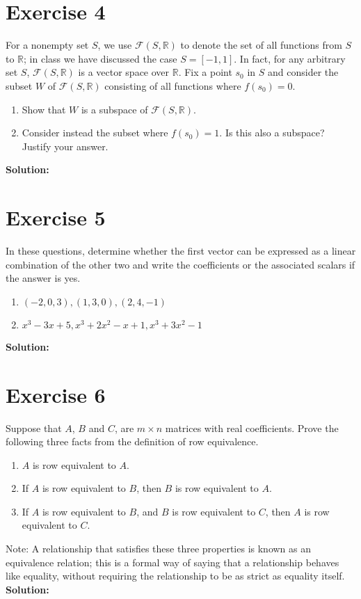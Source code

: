 \documentclass{article}
\begin{document}
\newpage

\section*{Exercise 4}
For a nonempty set $S$, we use $\mathcal{F}(S,\mathbb{R})$ to denote the set of all functions from $S$ to $\mathbb{R}$; in class we have discussed the case $S = [-1,1]$. In fact, for any arbitrary set $S$, $\mathcal{F}(S,\mathbb{R})$ is a vector space over $\mathbb{R}$. Fix a point $s_0$ in $S$ and consider the subset $W$ of $\mathcal{F}(S,\mathbb{R})$ consisting of all functions where $f(s_0) = 0$.
\begin{enumerate}[label=(\alph*)]
\item Show that $W$ is a subspace of $\mathcal{F}(S,\mathbb{R})$.
\item Consider instead the subset where $f(s_0) = 1$. Is this also a subspace? Justify your answer.
\end{enumerate}

\textbf{Solution:}
\newpage

\section*{Exercise 5}
In these questions, determine whether the first vector can be expressed as a linear combination of the other two and write the coefficients or the associated scalars if the answer is yes.
\begin{enumerate}[label=(\alph*)]
\item $(-2,0,3),(1,3,0),(2,4,-1)$
\item $x^3 - 3x + 5, x^3 + 2x^2 - x + 1, x^3 + 3x^2 - 1$
\end{enumerate}

\textbf{Solution:}
\newpage

\section*{Exercise 6}
Suppose that $A$, $B$ and $C$, are $m \times n$ matrices with real coefficients. Prove the following three facts from the definition of row equivalence.
\begin{enumerate}[label=(\alph*)]
\item $A$ is row equivalent to $A$.
\item If $A$ is row equivalent to $B$, then $B$ is row equivalent to $A$.
\item If $A$ is row equivalent to $B$, and $B$ is row equivalent to $C$, then $A$ is row equivalent to $C$.
\end{enumerate}
Note: A relationship that satisfies these three properties is known as an equivalence relation; this is a formal way of saying that a relationship behaves like equality, without requiring the relationship to be as strict as equality itself. \\

\textbf{Solution:}
\end{document}
